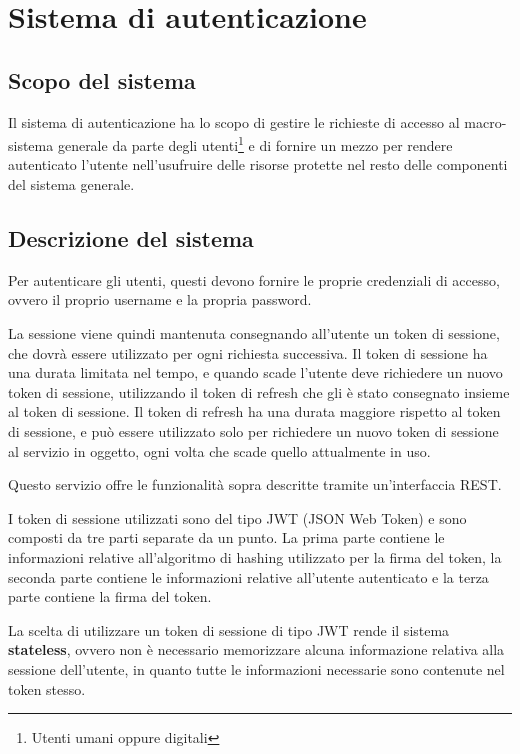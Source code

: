 \chapter{Sistema di autenticazione}


\section{Scopo del sistema}

Il sistema di autenticazione ha lo scopo di gestire le richieste di accesso al macro-sistema generale da parte degli utenti\footnote{Utenti umani oppure digitali} e di fornire un mezzo per rendere autenticato l'utente nell'usufruire delle risorse protette nel resto delle componenti del sistema generale.


\section{Descrizione del sistema}

Per autenticare gli utenti, questi devono fornire le proprie credenziali di accesso, ovvero il proprio username e la propria password.

La sessione viene quindi mantenuta consegnando all'utente un token di sessione, che dovrà essere utilizzato per ogni richiesta successiva. Il token di sessione ha una durata limitata nel tempo, e quando scade l'utente deve richiedere un nuovo token di sessione, utilizzando il token di refresh che gli è stato consegnato insieme al token di sessione. Il token di refresh ha una durata maggiore rispetto al token di sessione, e può essere utilizzato solo per richiedere un nuovo token di sessione al servizio in oggetto, ogni volta che scade quello attualmente in uso.

Questo servizio offre le funzionalità sopra descritte tramite un'interfaccia REST.

I token di sessione utilizzati sono del tipo JWT (JSON Web Token) e sono composti da tre parti separate da un punto. La prima parte contiene le informazioni relative all'algoritmo di hashing utilizzato per la firma del token, la seconda parte contiene le informazioni relative all'utente autenticato e la terza parte contiene la firma del token.

La scelta di utilizzare un token di sessione di tipo JWT rende il sistema \textbf{stateless}, ovvero non è necessario memorizzare alcuna informazione relativa alla sessione dell'utente, in quanto tutte le informazioni necessarie sono contenute nel token stesso.

